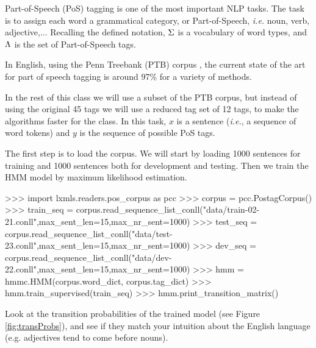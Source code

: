 Part-of-Speech (PoS) tagging is one of the most important NLP tasks. The
task is to assign each word a grammatical category, or Part-of-Speech, \emph{i.e.} noun,
verb, adjective,... Recalling the defined notation, $\Sigma$ is a 
vocabulary of word types, and 
$\Lambda$ is the set of Part-of-Speech tags.

In English, using the Penn Treebank (PTB) corpus \citep{pennTreeBank}, the current
state of the art for part of speech tagging is around 97\% for a
variety of methods.

In the rest of this class we will use a subset of the PTB corpus, but
instead of using the original 45 tags we will use a reduced tag set of
12 tags, to make the algorithms faster for the
class. In this task, $x$ is a sentence (\emph{i.e.}, a sequence of word tokens) and $y$
is the sequence of possible PoS tags.

The first step is to load the corpus. We will start by loading
1000 sentences for training and 1000 sentences both for development and
testing. Then we train the HMM model by maximum likelihood estimation.
\begin{python}
>>> import lxmls.readers.pos_corpus as pcc
>>> corpus = pcc.PostagCorpus()
>>> train_seq = corpus.read_sequence_list_conll("data/train-02-21.conll",max_sent_len=15,max_nr_sent=1000)
>>> test_seq = corpus.read_sequence_list_conll("data/test-23.conll",max_sent_len=15,max_nr_sent=1000)
>>> dev_seq = corpus.read_sequence_list_conll("data/dev-22.conll",max_sent_len=15,max_nr_sent=1000)
>>> hmm = hmmc.HMM(corpus.word_dict, corpus.tag_dict)
>>> hmm.train_supervised(train_seq)
>>> hmm.print_transition_matrix()
\end{python}


Look at the transition probabilities of the trained model
 (see
Figure \ref{fig:transProbs}), and see if they match your intuition
about the English language (e.g. adjectives tend to come before nouns).

